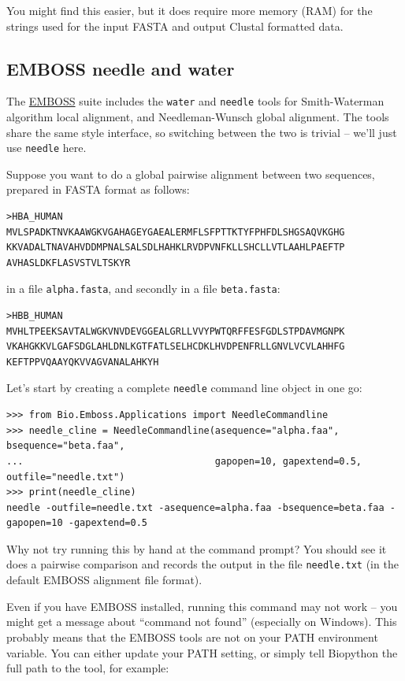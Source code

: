 \documentclass{report}
\begin{document}
You might find this easier, but it does require more memory (RAM) for the strings
used for the input FASTA and output Clustal formatted data.

\subsection{EMBOSS needle and water}
\label{seq:emboss-needle-water}
The \href{http://emboss.sourceforge.net/}{EMBOSS} suite includes the \texttt{water} and
\texttt{needle} tools for Smith-Waterman algorithm local alignment, and Needleman-Wunsch
global alignment. The tools share the same style interface, so switching between the two
is trivial -- we'll just use \texttt{needle} here.

Suppose you want to do a global pairwise alignment between two sequences, prepared in
FASTA format as follows:

\begin{verbatim}
>HBA_HUMAN
MVLSPADKTNVKAAWGKVGAHAGEYGAEALERMFLSFPTTKTYFPHFDLSHGSAQVKGHG
KKVADALTNAVAHVDDMPNALSALSDLHAHKLRVDPVNFKLLSHCLLVTLAAHLPAEFTP
AVHASLDKFLASVSTVLTSKYR
\end{verbatim}

\noindent in a file \texttt{alpha.fasta}, and secondly in a file \texttt{beta.fasta}:

\begin{verbatim}
>HBB_HUMAN
MVHLTPEEKSAVTALWGKVNVDEVGGEALGRLLVVYPWTQRFFESFGDLSTPDAVMGNPK
VKAHGKKVLGAFSDGLAHLDNLKGTFATLSELHCDKLHVDPENFRLLGNVLVCVLAHHFG
KEFTPPVQAAYQKVVAGVANALAHKYH
\end{verbatim}

Let's start by creating a complete \texttt{needle} command line object in one go:

\begin{verbatim}
>>> from Bio.Emboss.Applications import NeedleCommandline
>>> needle_cline = NeedleCommandline(asequence="alpha.faa", bsequence="beta.faa",
...                                  gapopen=10, gapextend=0.5, outfile="needle.txt")
>>> print(needle_cline)
needle -outfile=needle.txt -asequence=alpha.faa -bsequence=beta.faa -gapopen=10 -gapextend=0.5
\end{verbatim}

Why not try running this by hand at the command prompt? You should see it does a
pairwise comparison and records the output in the file \texttt{needle.txt} (in the
default EMBOSS alignment file format).

Even if you have EMBOSS installed, running this command may not work -- you
might get a message about ``command not found'' (especially on Windows). This
probably means that the EMBOSS tools are not on your PATH environment
variable. You can either update your PATH setting, or simply tell Biopython
the full path to the tool, for example:
\end{document}
